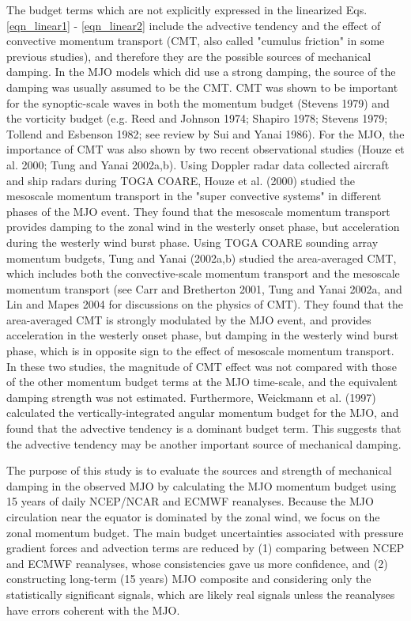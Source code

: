 \documentclass[12pt]{article}
\begin{document}
The budget terms which are not explicitly expressed in the linearized 
Eqs. \ref{eqn_linear1} - \ref{eqn_linear2}
include the advective tendency and the effect of convective momentum transport
(CMT, also called "cumulus friction" in some previous studies),
and therefore they are the possible sources of mechanical damping.
In the MJO models which did use a strong damping, the source of the damping
was usually assumed to be the CMT. 
CMT was shown to be important for the synoptic-scale waves in both
the momentum budget (Stevens 1979) and the vorticity budget
(e.g. Reed and Johnson 1974; Shapiro 1978; 
Stevens 1979; Tollend and Esbenson 1982; see review by Sui and Yanai 1986).
For the MJO, 
the importance of CMT was also shown by two recent observational
studies (Houze et al. 2000; Tung and Yanai 2002a,b).
Using Doppler radar data collected aircraft and ship radars during TOGA COARE, 
Houze et al. (2000) studied the mesoscale momentum transport in 
the "super convective systems" in different phases of the MJO event.
They found that
the mesoscale momentum transport provides damping to
the zonal wind in the westerly onset phase, but acceleration during the
westerly wind burst phase.
Using TOGA COARE sounding array momentum budgets, 
Tung and Yanai (2002a,b) studied the area-averaged CMT, 
which includes
both the convective-scale momentum transport and the mesoscale momentum
transport (see Carr and Bretherton 2001, Tung and Yanai 2002a, 
and Lin and Mapes 2004 for discussions
on the physics of CMT). 
They found that the area-averaged CMT is strongly modulated by the MJO
event, and provides acceleration in the westerly onset phase,
but damping in the westerly wind burst phase, 
which is in opposite sign to the effect of mesoscale momentum transport.
In these two studies, the magnitude of CMT effect was not compared with
those of the other momentum budget terms at the MJO time-scale, and 
the equivalent damping strength was not estimated.
Furthermore, Weickmann et al. (1997) calculated the vertically-integrated
angular momentum budget for the MJO, and found that the advective tendency
is a dominant budget term. This suggests that the advective tendency may be
another important source of mechanical damping. 

The purpose of this study is
to evaluate the sources and strength of mechanical damping in the observed MJO
by calculating the MJO momentum budget using 15 years of daily
NCEP/NCAR and ECMWF reanalyses. 
Because the MJO circulation near the equator is dominated by the zonal wind,
we focus on the zonal momentum budget.
The main budget uncertainties associated
with pressure gradient forces and advection terms are reduced by (1)
comparing between NCEP and ECMWF reanalyses, whose consistencies gave
us more confidence, and (2) constructing long-term (15 years) MJO
composite and considering only the statistically significant signals,
which are likely real signals unless the reanalyses have
errors coherent with the MJO.
\end{document}
